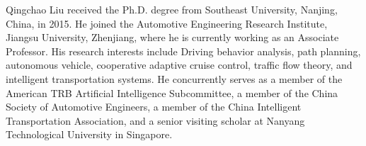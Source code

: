 
\vspace{-5 mm} 
\begin{IEEEbiography}{Qingchao Liu }
    received the Ph.D. degree from Southeast University, Nanjing, China, in 2015. He joined the Automotive Engineering Research Institute, Jiangsu University, Zhenjiang, where he is currently working as an Associate Professor. His research interests include Driving behavior analysis, path planning, autonomous vehicle, cooperative adaptive cruise control, traffic flow theory, and intelligent transportation systems. He concurrently serves as a member of the American TRB Artificial Intelligence Subcommittee, a member of the China Society of Automotive Engineers, a member of the China Intelligent Transportation Association, and a senior visiting scholar at Nanyang Technological University in Singapore.
    \end{IEEEbiography}
    
